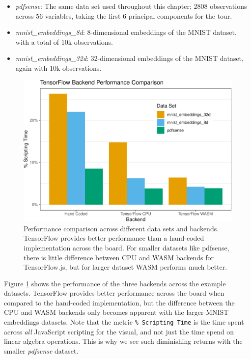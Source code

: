 \begin{itemize}
\tightlist
\item
  \emph{pdfsense}: The same data set used throughout this chapter; 2808 observations across 56 variables, taking the first 6 principal components for the tour.
\item
  \emph{mnist\_embeddings\_8d}: 8-dimensional embeddings of the MNIST dataset, with a total of 10k observations.
\item
  \emph{mnist\_embeddings\_32d}: 32-dimensional embeddings of the MNIST dataset, again with 10k observations.
\end{itemize}

\begin{figure}

{\centering \includegraphics[width=0.75\linewidth]{detourr_files/figure-latex/backend-comparison-1} 

}

\caption{Performance comparison across different data sets and backends. TensorFlow provides better performance than a hand-coded implementation across the board. For smaller datasets like pdfsense, there is little difference between CPU and WASM backends for TensorFlow.js, but for larger dataset WASM performs much better.}\label{fig:backend-comparison}
\end{figure}

Figure \ref{fig:backend-comparison} shows the performance of the three backends across the example datasets. TensorFlow provides better performance across the board when compared to the hand-coded implementation, but the difference between the CPU and WASM backends only becomes apparent with the larger MNIST embeddings datasets. Note that the metric \texttt{\%\ Scripting\ Time} is the time spent across \emph{all} JavaScript scripting for the visual, and not just the time spend on linear algebra operations. This is why we see such diminishing returns with the smaller \emph{pdfsense} dataset.


